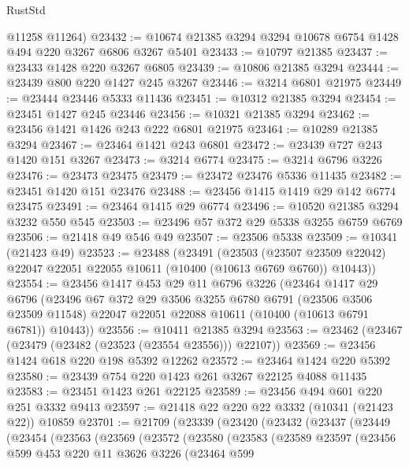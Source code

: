 \begin{lexlean}{RustStd}
\begin{coremodule}
{\begin{coremodule}
{{{{{{{{{{{{{{{{{{{{{{{{{      @11258
      @11264)
@23432 := @10674 @21385 @3294 @3294 @10678 @6754 @1428 @494 @220 @3267 @6806 @3267 @5401
@23433 := @10797 @21385
@23437 := @23433 @1428 @220 @3267 @6805
@23439 := @10806 @21385 @3294
@23444 := @23439 @800 @220 @1427 @245 @3267
@23446 := @3214 @6801 @21975
@23449 := @23444 @23446 @5333 @11436
@23451 := @10312 @21385 @3294
@23454 := @23451 @1427 @245 @23446
@23456 := @10321 @21385 @3294
@23462 := @23456 @1421 @1426 @243 @222 @6801 @21975
@23464 := @10289 @21385 @3294
@23467 := @23464 @1421 @243 @6801
@23472 := @23439 @727 @243 @1420 @151 @3267
@23473 := @3214 @6774
@23475 := @3214 @6796 @3226
@23476 := @23473 @23475
@23479 := @23472 @23476 @5336 @11435
@23482 := @23451 @1420 @151 @23476
@23488 := @23456 @1415 @1419 @29 @142 @6774 @23475
@23491 := @23464 @1415 @29 @6774
@23496 := @10520 @21385 @3294 @3232 @550 @545
@23503 := @23496 @57 @372 @29 @5338 @3255 @6759 @6769
@23506 := @21418 @49 @546 @49
@23507 := @23506 @5338
@23509 := @10341 (@21423 @49)
@23523 := @23488
    (@23491
      (@23503
        (@23507 @23509 @22042)
        @22047
        @22051
        @22055
        @10611
        (@10400 (@10613 @6769 @6760))
        @10443))
@23554 := @23456
    @1417
    @453
    @29
    @11
    @6796
    @3226
    (@23464
      @1417
      @29
      @6796
      (@23496
        @67
        @372
        @29
        @3506
        @3255
        @6780
        @6791
        (@23506 @3506 @23509 @11548)
        @22047
        @22051
        @22088
        @10611
        (@10400 (@10613 @6791 @6781))
        @10443))
@23556 := @10411 @21385 @3294
@23563 := @23462 (@23467 (@23479 (@23482 (@23523 (@23554 @23556))) @22107))
@23569 := @23456 @1424 @618 @220 @198 @5392 @12262
@23572 := @23464 @1424 @220 @5392
@23580 := @23439 @754 @220 @1423 @261 @3267 @22125 @4088 @11435
@23583 := @23451 @1423 @261 @22125
@23589 := @23456 @494 @601 @220 @251 @3332 @9413
@23597 := @21418 @22 @220 @22 @3332 (@10341 (@21423 @22)) @10859
@23701 := @21709
    (@23339
      (@23420
        (@23432
          (@23437
            (@23449
              (@23454
                (@23563
                  (@23569
                    (@23572
                      (@23580
                        (@23583
                          (@23589
                            @23597
                            (@23456
                              @599
                              @453
                              @220
                              @11
                              @3626
                              @3226
                              (@23464
                                @599
}}}}}}}}}}}}}}}}}}}}}}}}}
\end{coremodule}}
\end{coremodule}
\end{lexlean}
